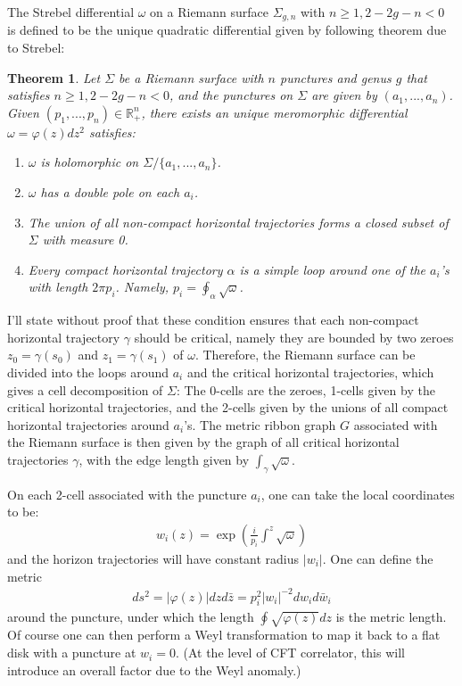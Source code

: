 \documentclass[12pt,letterpaper]{article}
\def\ie{\begin{equation}\begin{aligned}}
\def\fe{\end{aligned}\end{equation}}
\numberwithin{equation}{section}
\newtheorem{theorem}{Theorem}
\begin{document}
The Strebel differential $\omega$ on a Riemann surface $\Sigma_{g,n}$ with $n\geq 1, 2-2g-n<0$ is defined to be the unique quadratic differential given by following theorem due to Strebel:
\begin{theorem} Let $\Sigma$ be a Riemann surface with $n$ punctures and genus $g$ that satisfies $n\geq 1, 2-2g-n<0$, and the punctures on $\Sigma$ are given by $(a_1,...,a_n)$. Given $(p_1,...,p_n)\in \mathbb{R}_+^n$, there exists an unique meromorphic differential $\omega=\varphi(z) dz^2$ satisfies:
\begin{enumerate}
\item[$\bullet$] $\omega$ is holomorphic on $\Sigma/\{a_1,...,a_n\}$.
\item[$\bullet$] $\omega$ has a double pole on each $a_i$.
\item[$\bullet$] The union of all non-compact horizontal trajectories forms a closed subset of $\Sigma$ with measure 0.
\item[$\bullet$] Every compact horizontal trajectory $\alpha$ is a simple loop around one of the $a_i$'s with length $2\pi p_i$. Namely, $p_i=\oint_\alpha \sqrt{\omega}$.
\end{enumerate}
\end{theorem}

I'll state without proof that these condition ensures that each non-compact horizontal trajectory $\gamma$ should be critical, namely they are bounded by two zeroes $z_0=\gamma(s_0)$ and $z_1=\gamma(s_1)$ of $\omega$. Therefore, the Riemann surface can be divided into the loops around $a_i$ and the critical horizontal trajectories, which gives a cell decomposition of $\Sigma$: The 0-cells are the zeroes, 1-cells given by the critical horizontal trajectories, and the 2-cells given by the unions of all compact horizontal trajectories around $a_i$'s. The metric ribbon graph $G$ associated with the Riemann surface is then given by the graph of all critical horizontal trajectories $\gamma$, with the edge length given by $\int_\gamma \sqrt{\omega}$.

On each 2-cell associated with the puncture $a_i$, one can take the local coordinates to be:
\ie
w_i(z) = \exp\left(\frac{i}{p_i}\int^z \sqrt{\omega}\right)
\label{diskcoord}
\fe
and the horizon trajectories will have constant radius $|w_i|$. One can define the metric
\ie
ds^2=|\varphi(z)|dzd\bar{z}=p_i^2 |w_i|^{-2}dw_i d\bar{w}_i
\label{metricpuncture}
\fe
around the puncture, under which the length $\oint \sqrt{\varphi(z)}dz$ is the metric length. Of course one can then perform a Weyl transformation to map it back to a flat disk with a puncture at $w_i=0$. (At the level of CFT correlator, this will introduce an overall factor due to the Weyl anomaly.)
\end{document}
